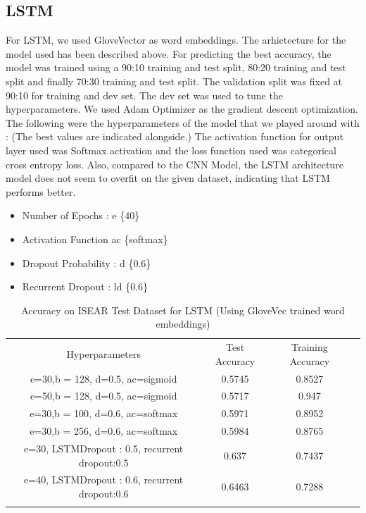 \documentclass[conference]{IEEEtran}
\numberwithin{equation}{section}
\numberwithin{figure}{section}
\numberwithin{table}{section}
\begin{document}
\subsection{LSTM}
For LSTM, we used GloveVector as word embeddings. The arhictecture for the model used has been described above. For predicting the best accuracy, the model was trained using a 90:10 training and test split, 80:20 training and test split and finally 70:30 training and test split. The validation split was fixed at 90:10 for training and dev set. The dev set was used to tune the hyperparameters. We used Adam Optimizer as the gradient descent optimization. The following were the hyperparameters of the model that we played around with : (The best values are indicated alongside.) The activation function for output layer used was Softmax activation and the loss function used was categorical cross entropy loss. Also, compared to the CNN Model, the LSTM architecture model does not seem to overfit on the given dataset, indicating that LSTM performs better.
\begin{itemize}
\item Number of Epochs : e  \{40\}
\item Activation Function ac    \{softmax\}
\item Dropout Probability : d \{0.6\}
\item Recurrent Dropout : ld \{0.6\}
\end{itemize}

\begin{table}[!htb]
 \centering
 \caption{Accuracy on ISEAR Test Dataset for LSTM (Using GloveVec trained word embeddings)}
 \label{tab_cnn}
\begin{tabular}{ c c c c } 
    \noalign{\smallskip}\hline\noalign{\smallskip}
	Hyperparameters & Test Accuracy & Training Accuracy \\
       \noalign{\smallskip}\hline\noalign{\smallskip}
	e=30,b = 128, d=0.5, ac=sigmoid  & 0.5745 & 0.8527\\
	e=50,b = 128, d=0.5, ac=sigmoid  & 0.5717 & 0.947\\
	e=30,b = 100, d=0.6, ac=softmax  & 0.5971 & 0.8952\\
	e=30,b = 256, d=0.6, ac=softmax  & 0.5984 & 0.8765\\
	e=30, LSTMDropout : 0.5, recurrent dropout:0.5    & 0.637 & 0.7437\\
	e=40, LSTMDropout : 0.6, recurrent dropout:0.6   & 0.6463 & 0.7288 \\
    \noalign{\smallskip}\hline
  \end{tabular} 
\end{table}
\end{document}
